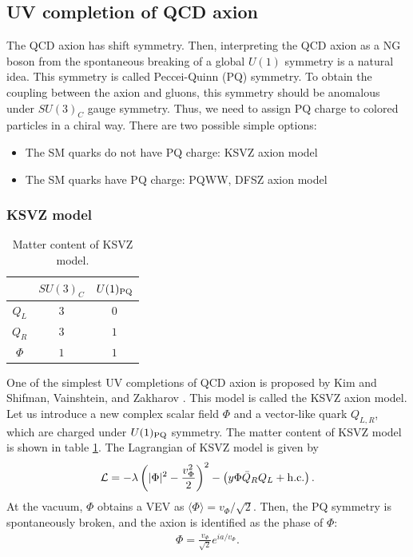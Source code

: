 \documentclass[11pt,a4paper]{article}
\begin{document}
\subsection{UV completion of QCD axion}
The QCD axion has shift symmetry. Then, interpreting the QCD axion as a NG boson from the spontaneous breaking of a global $U(1)$ symmetry is a natural idea.
This symmetry is called Peccei-Quinn (PQ) symmetry. To obtain the coupling between the axion and gluons, this symmetry should be anomalous under $SU(3)_C$ gauge symmetry. Thus, we need to assign PQ charge to colored particles in a chiral way. There are two possible simple options:
\begin{itemize}
    \item The SM quarks do not have PQ charge: KSVZ axion model
    \item The SM quarks have PQ charge: PQWW, DFSZ axion model
\end{itemize}


\subsubsection{KSVZ model}
\begin{table}[h]
\centering
\begin{tabular}{c|cc}
& $SU(3)_C$ & $U(1)_{\rm PQ}$ \\\hline
$Q_L$ & $3$ & $0$ \\
$Q_R$ & $3$ & $1$ \\
$\Phi$ & $1$ & $1$
\end{tabular}
\caption{Matter content of KSVZ model.}\label{tab:KSVZ}
\end{table}
%
One of the simplest UV completions of QCD axion is proposed by Kim \cite{Kim:1979if} and Shifman, Vainshtein, and Zakharov \cite{Shifman:1979if}. This model is called the KSVZ axion model.
Let us introduce a new complex scalar field $\Phi$ and a vector-like quark $Q_{L,R}$, which are charged under $U(1)_{\rm PQ}$ symmetry. The matter content of KSVZ model is shown in table \ref{tab:KSVZ}. The Lagrangian of KSVZ model is given by
\begin{align}
    {\cal L} = -\lambda \left( |\Phi|^2 - \frac{v_\Phi^2}{2} \right)^2 - \left( y \Phi \bar Q_R Q_L + {\rm h.c.} \right).
\end{align}
At the vacuum, $\Phi$ obtains a VEV as $\langle \Phi \rangle = v_\Phi/\sqrt{2}$. Then, the PQ symmetry is spontaneously broken, and the axion is identified as the phase of $\Phi$:
\begin{align}
    \Phi = \frac{v_\Phi}{\sqrt{2}} e^{i a/v_\Phi}.
\end{align}
\end{document}
